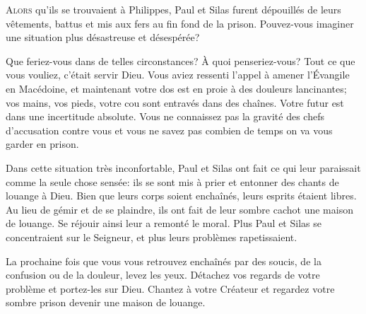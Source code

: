 \jrnlmonth





\lettrine{A}{lors} qu'ils se trouvaient à Philippes,
 Paul et Silas furent dépouillés de leurs vêtements,
 battus et mis aux fers au fin fond de la prison.
 Pouvez-vous imaginer une situation plus désastreuse et désespérée?

Que feriez-vous dans de telles circonstances? À quoi penseriez-vous?
 Tout ce que vous vouliez, c'était servir Dieu.
 Vous aviez ressenti l'appel à amener l'Évangile en Macédoine,
 et maintenant votre dos est en proie
 à des douleurs lancinantes;
 vos mains, vos pieds, votre cou sont entravés dans des chaînes.
 Votre futur est dans une incertitude absolute.
 Vous ne connaissez pas la gravité des chefs d'accusation
 contre vous et vous ne savez pas combien de temps
 on va vous garder en prison.

Dans cette situation très inconfortable, Paul et Silas
 ont fait ce qui leur paraissait comme la seule chose sensée:
 ils se sont mis à prier et entonner des chants de louange à Dieu.
 Bien que leurs corps soient enchaînés, leurs esprits étaient libres.
 Au lieu de gémir et de se plaindre, ils ont fait de leur sombre cachot
 une maison de louange. Se réjouir ainsi leur a remonté le moral.
 Plus Paul et Silas se concentraient sur le Seigneur,
 et plus leurs problèmes rapetissaient.


La prochaine fois que vous vous retrouvez enchaînés par des soucis,
 de la confusion ou de la douleur, levez les yeux.
 Détachez vos regards de votre problème et portez-les sur Dieu.
 Chantez à votre Créateur \ocadr et regardez votre sombre prison
 devenir une maison de louange.

\dvrule




